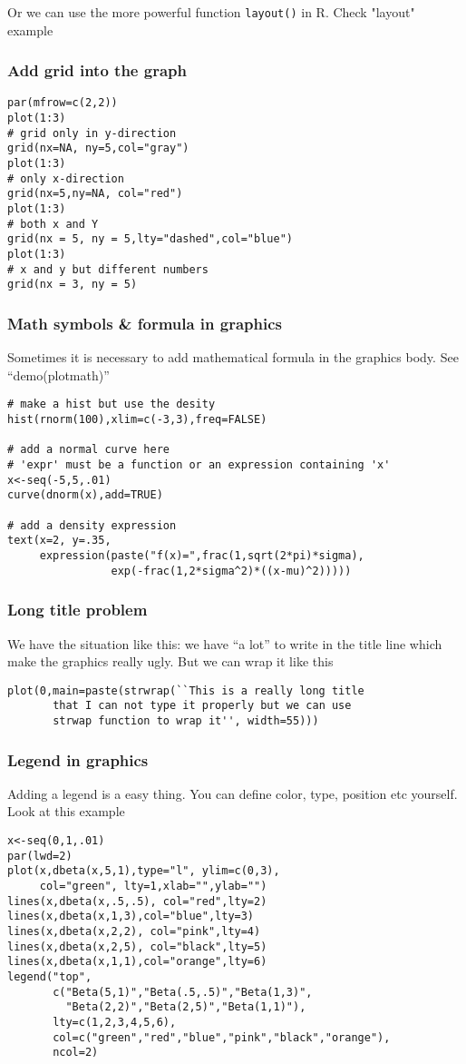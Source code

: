 \documentclass[10pt]{beamer}
\begin{document}
\begin{frame}
  Or we can use the more powerful function \texttt{layout()} in
  R. Check "layout" example
\end{frame}


\begin{frame}[fragile]
  \frametitle{Add grid into the graph}
\begin{verbatim}
par(mfrow=c(2,2))
plot(1:3)
# grid only in y-direction
grid(nx=NA, ny=5,col="gray")
plot(1:3)
# only x-direction
grid(nx=5,ny=NA, col="red")
plot(1:3)
# both x and Y
grid(nx = 5, ny = 5,lty="dashed",col="blue")
plot(1:3)
# x and y but different numbers
grid(nx = 3, ny = 5)
\end{verbatim}
\end{frame}


\begin{frame}[fragile]
  \frametitle{Math symbols \& formula in graphics} Sometimes it is
  necessary to add mathematical formula in the graphics body. See
  ``demo(plotmath)''
\begin{verbatim}
# make a hist but use the desity
hist(rnorm(100),xlim=c(-3,3),freq=FALSE)

# add a normal curve here
# 'expr' must be a function or an expression containing 'x'
x<-seq(-5,5,.01)
curve(dnorm(x),add=TRUE)

# add a density expression
text(x=2, y=.35,
     expression(paste("f(x)=",frac(1,sqrt(2*pi)*sigma),
                exp(-frac(1,2*sigma^2)*((x-mu)^2)))))
\end{verbatim}
\end{frame}


\begin{frame}[fragile]
  \frametitle{Long title problem}
  We have the situation like this: we have ``a lot'' to write in the
  title line which make the graphics really ugly. But we can wrap it
  like this
\begin{verbatim}
plot(0,main=paste(strwrap(``This is a really long title
       that I can not type it properly but we can use
       strwap function to wrap it'', width=55)))
\end{verbatim}
\end{frame}

\begin{frame}[fragile]
  \frametitle{Legend in graphics}
  Adding a legend is a easy thing. You can define color, type,
  position etc yourself. Look at this example
\begin{verbatim}
x<-seq(0,1,.01)
par(lwd=2)
plot(x,dbeta(x,5,1),type="l", ylim=c(0,3),
     col="green", lty=1,xlab="",ylab="")
lines(x,dbeta(x,.5,.5), col="red",lty=2)
lines(x,dbeta(x,1,3),col="blue",lty=3)
lines(x,dbeta(x,2,2), col="pink",lty=4)
lines(x,dbeta(x,2,5), col="black",lty=5)
lines(x,dbeta(x,1,1),col="orange",lty=6)
legend("top",
       c("Beta(5,1)","Beta(.5,.5)","Beta(1,3)",
         "Beta(2,2)","Beta(2,5)","Beta(1,1)"),
       lty=c(1,2,3,4,5,6),
       col=c("green","red","blue","pink","black","orange"),
       ncol=2)
\end{verbatim}
\end{frame}
\end{document}
